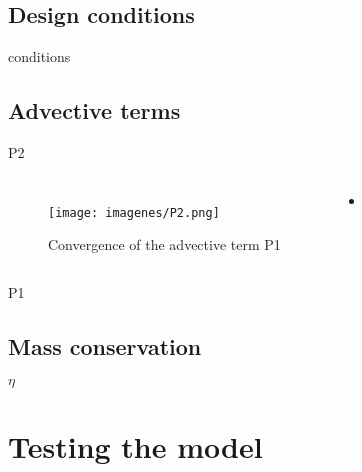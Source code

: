 \documentclass{beamer}
\begin{document}
\subsection{Design conditions}
\begin{frame}{conditions}

\end{frame}

\subsection{Advective terms}
\begin{frame}{P2}

\begin{columns}[c]
	\begin{figure}
		\texttt{[image: imagenes/P2.png]}
		\caption{Convergence of the advective term P1}
	\end{figure}
	
	\begin{itemize}
		\item
	\end{itemize}
\end{columns}
\end{frame}

\begin{frame}{P1}
\end{frame}

\subsection{Mass conservation}
\begin{frame}{$\eta$}
\end{frame}

\section{Testing the model}
\end{document}
